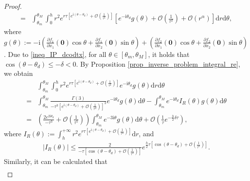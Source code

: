 \documentclass[10pt,a4paper]{amsart}
\begin{document}
\begin{proof}
\begin{align}
		= & \int_{\theta_m}^{\theta_M} \int_{0}^{h} r^2 e^{r \tau\left[e^{\mathrm{i}\left(\theta-\theta_d\right)} + \mathcal{O}\left(\frac{1}{\tau^2}\right)\right]}\left[e^{-\mathrm{i}\theta_d}g\left(\theta\right) + \mathcal{O}\left(\frac{1}{\tau^2}\right) + \mathcal{O}\left(r^{\alpha}\right)\right] \mathrm{d}r \mathrm{d}\theta ,
	\end{align}
	where $ g\left(\theta\right) := -\text{i}\left(\frac{\partial f_1}{\partial x_1}\left(\bm{0}\right)\cos\theta + \frac{\partial f_1}{\partial x_2}\left(\bm{0}\right)\sin\theta\right) + \left(\frac{\partial f_2}{\partial x_1}\left(\bm{0}\right)\cos\theta + \frac{\partial f_2}{\partial x_2}\left(\bm{0}\right)\sin\theta\right) $. Due to \eqref{ineq_IP_dcodtx}, for all $ \theta\in\left[\theta_m, \theta_M\right] $, it holds that $ \cos \left(\theta-\theta_d\right) \leqslant -\delta < 0 $. By Proposition \ref{prop_inverse_problem_integral_re}, we obtain
	\begin{align*}
		& \int_{\theta_m}^{\theta_M} \int_{0}^{h} r^2 e^{r \tau\left[e^{\mathrm{i}\left(\theta-\theta_d\right)} + \mathcal{O}\left(\frac{1}{\tau^2}\right)\right]} e^{-\mathrm{i}\theta_d}g\left(\theta\right) \mathrm{d}r \mathrm{d}\theta \\
		= & \int_{\theta_m}^{\theta_M} \frac{\Gamma\left(3\right) }{-\tau^3\left[e^{\text{i}\left(\theta-\theta_d\right)} + \mathcal{O} \left(\frac{1}{\tau^2}\right)\right]^3} e^{-\text{i}\theta_d}g\left(\theta\right) \mathrm{d}\theta - \int_{\theta_m}^{\theta_M} e^{-\text{i}\theta_d} I_R\left(\theta\right) g\left(\theta\right) \mathrm{d}\theta \\
		= & \left(\frac{2e^{2\text{i}\theta_d}}{-\tau^3} + \mathcal{O} \left(\frac{1}{\tau^5}\right)\right)  \int_{\theta_m}^{\theta_M} e^{-3\text{i}\theta} g\left(\theta\right) \mathrm{d}\theta + \mathcal{O} \left( \frac{1}{\tau} e^{-\frac{h}{2}\delta\tau} \right) ,
	\end{align*}
	where $ I_R\left(\theta\right) := \int_{h}^{+\infty} r^2 e^{r \tau\left[e^{\mathrm{i}\left(\theta-\theta_d\right)} + \mathcal{O}\left(\frac{1}{\tau^2}\right)\right]} \mathrm{d}r $, and 
	\begin{align*}
		\left| I_R\left(\theta\right) \right| \leqslant \frac{2}{-\tau\left[\cos\left(\theta-\theta_d\right) + \mathcal{O}\left(\frac{1}{\tau^2}\right)\right]}e^{\frac{h}{2}\tau\left[\cos\left(\theta-\theta_d\right) + \mathcal{O}\left(\frac{1}{\tau^2}\right)\right]} .
	\end{align*}
	Similarly, it can be calculated that
	\begin{align*}

\end{align*}
\end{proof}
\end{document}
